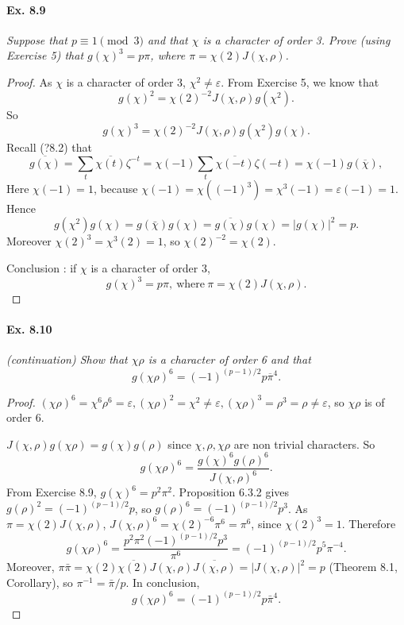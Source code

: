 \documentclass[11pt,a4paper]{article}
\begin{document}
{\paragraph{Ex. 8.9}

{\it Suppose that $p\equiv 1 \pmod 3$ and that $\chi$ is a character of order 3. Prove (using Exercise 5) that $g(\chi)^3 = p\pi$, where $\pi = \chi(2)J(\chi,\rho)$.
}

\begin{proof}
As $\chi$ is a character of order 3, $\chi^2\neq \varepsilon$. From Exercise 5, we know that
$$g(\chi)^2 = \chi(2)^{-2} J(\chi,\rho) g(\chi^2).$$
So
$$g(\chi)^3 = \chi(2)^{-2} J(\chi,\rho) g(\chi^2)g(\chi).$$
Recall  (?8.2) that
$$\overline{g(\chi)} = \sum_t \overline{\chi(t)} \zeta^{-t} = \chi(-1) \sum_t \overline{\chi(-t)} \zeta(-t) = \chi(-1) g(\overline{\chi}),$$
Here $\chi(-1) = 1$, because $\chi(-1) = \chi((-1)^3) = \chi^3(-1) = \varepsilon(-1) = 1$.
Hence
$$g(\chi^2) g(\chi) = g(\bar{\chi}) g(\chi) =\overline{g(\chi)} g(\chi) = \vert g(\chi) \vert^2 =p.$$
Moreover $\chi(2)^3 = \chi^3(2) = 1$, so $\chi(2)^{-2} = \chi(2)$.

\medskip

Conclusion : if $\chi$ is a character of order 3,
 $$g(\chi)^3 = p \pi, \ \mathrm{where}\ \pi = \chi(2) J(\chi,\rho).$$
\end{proof}

\paragraph{Ex. 8.10}

{\it (continuation) Show that $\chi \rho$ is a character of order 6 and that $$g(\chi \rho)^6 = (-1)^{(p-1)/2} p \overline{\pi}^4.$$
}

\begin{proof}
$(\chi \rho)^6 = \chi^6 \rho^6 = \varepsilon, (\chi \rho)^2 = \chi^2 \neq \varepsilon, (\chi \rho)^3 = \rho^3 = \rho \neq \varepsilon$, so  $\chi \rho$ is of order 6.

$J(\chi,\rho) g(\chi \rho) = g(\chi) g(\rho)$ since $\chi, \rho, \chi \rho$ are non trivial characters. So
$$g(\chi \rho)^6 = \frac{g(\chi)^6 g(\rho)^6}{J(\chi, \rho)^6}.$$
From Exercise 8.9, $g(\chi)^6 = p^2 \pi^2$. Proposition 6.3.2 gives $g(\rho)^2 = (-1)^{(p-1)/2} p$, so $g(\rho)^6 =  (-1)^{(p-1)/2} p^3$. 
As $\pi = \chi(2) J(\chi,\rho)$,  $J(\chi,\rho)^6 = \chi(2)^{-6} \pi^6 = \pi^6$, since $\chi(2)^3=1$. Therefore
 $$g(\chi \rho)^6 = \frac{p^2 \pi^2 (-1)^{(p-1)/2} p^3}{\pi^6} = (-1)^{(p-1)/2} p^5 \pi^{-4}.$$
 Moreover, $\pi \bar{\pi} = \chi(2) \overline{\chi(2)} J(\chi,\rho) \overline {J(\chi,\rho)} = \vert J(\chi,\rho) \vert^2 =p$ (Theorem 8.1, Corollary), so $ \pi^{-1} = \bar{\pi}/p$. In conclusion,
$$g(\chi \rho)^6 = (-1)^{(p-1)/2} p \bar{\pi}^4.$$
\end{proof}

}
\end{document}
